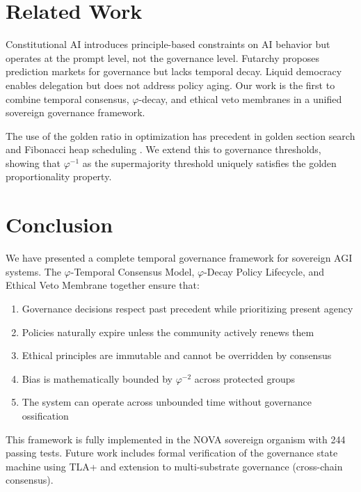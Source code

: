 \documentclass[11pt,twocolumn]{article}
\begin{document}
\section{Related Work}

Constitutional AI \cite{bai2022constitutional} introduces principle-based
constraints on AI behavior but operates at the prompt level, not the
governance level. Futarchy \cite{hanson2013shall} proposes prediction markets
for governance but lacks temporal decay. Liquid democracy \cite{blum2016liquid}
enables delegation but does not address policy aging. Our work is the first
to combine temporal consensus, $\varphi$-decay, and ethical veto membranes
in a unified sovereign governance framework.

The use of the golden ratio in optimization has precedent in golden section
search \cite{kiefer1953sequential} and Fibonacci heap scheduling
\cite{fredman1987fibonacci}. We extend this to governance thresholds,
showing that $\varphi^{-1}$ as the supermajority threshold uniquely
satisfies the golden proportionality property.

\section{Conclusion}

We have presented a complete temporal governance framework for sovereign
AGI systems. The $\varphi$-Temporal Consensus Model, $\varphi$-Decay Policy
Lifecycle, and Ethical Veto Membrane together ensure that:

\begin{enumerate}
\item Governance decisions respect past precedent while prioritizing present agency
\item Policies naturally expire unless the community actively renews them
\item Ethical principles are immutable and cannot be overridden by consensus
\item Bias is mathematically bounded by $\varphi^{-2}$ across protected groups
\item The system can operate across unbounded time without governance ossification
\end{enumerate}

This framework is fully implemented in the NOVA sovereign organism with
244 passing tests. Future work includes formal verification of the governance
state machine using TLA+ and extension to multi-substrate governance
(cross-chain consensus).
\end{document}

